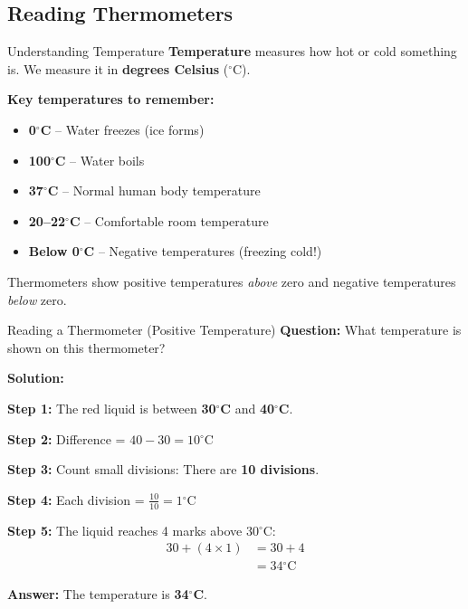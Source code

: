 \documentclass[12pt,a4paper]{article}
\newcommand{\degC}{$^\circ$C}
\begin{document}
\subsection{Reading Thermometers}

\begin{conceptbox}{Understanding Temperature}
\textbf{Temperature} measures how hot or cold something is. We measure it in \textbf{degrees Celsius} (\degC).

\textbf{Key temperatures to remember:}
\begin{itemize}[leftmargin=*]
\item \textbf{0\degC} -- Water freezes (ice forms)
\item \textbf{100\degC} -- Water boils
\item \textbf{37\degC} -- Normal human body temperature
\item \textbf{20--22\degC} -- Comfortable room temperature
\item \textbf{Below 0\degC} -- Negative temperatures (freezing cold!)
\end{itemize}

Thermometers show positive temperatures \textit{above} zero and negative temperatures \textit{below} zero.
\end{conceptbox}

\begin{examplebox}{Reading a Thermometer (Positive Temperature)}
\textbf{Question:} What temperature is shown on this thermometer?

\begin{center}
\end{center}

\textbf{Solution:}

\textbf{Step 1:} The red liquid is between \textbf{30\degC} and \textbf{40\degC}.

\textbf{Step 2:} Difference = $40 - 30 = 10$\degC

\textbf{Step 3:} Count small divisions: There are \textbf{10 divisions}.

\textbf{Step 4:} Each division = $\frac{10}{10} = 1$\degC

\textbf{Step 5:} The liquid reaches 4 marks above 30\degC:
\begin{align*}
30 + (4 \times 1) &= 30 + 4 \\
&= \boxed{34\text{\degC}}
\end{align*}

\textbf{Answer:} The temperature is \textbf{34\degC}.
\end{examplebox}
\end{document}
